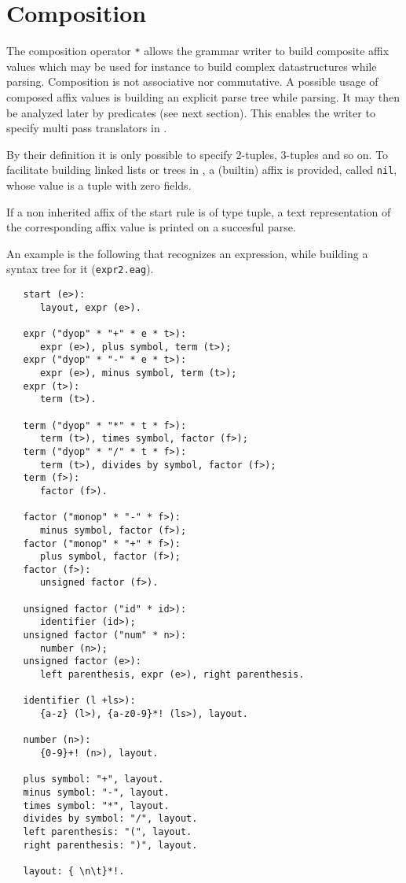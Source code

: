 \section {Composition}
The composition operator \verb+*+ allows the grammar writer
to build composite affix values which may be used for instance
to build complex datastructures while parsing. Composition is not
associative nor commutative. A possible usage of composed affix
values is building an explicit parse tree while parsing. It may
then be analyzed later by predicates (see next section). This
enables the \EAG writer to specify multi pass translators in \EAGns.

By their definition it is only possible to specify 2-tuples,
3-tuples and so on. To facilitate building linked lists or
trees in \EAGns, a (builtin) affix is provided, called {\tt nil},
whose value is a tuple with zero fields.

If a non inherited affix of the start rule is of type tuple, a
text representation of the corresponding affix value is printed
on a succesful parse.

An example is the following \EAG that recognizes an expression,
while building a syntax tree for it ({\tt expr2.eag}).
\begin{verbatim}
   start (e>):
      layout, expr (e>).

   expr ("dyop" * "+" * e * t>):
      expr (e>), plus symbol, term (t>);
   expr ("dyop" * "-" * e * t>):
      expr (e>), minus symbol, term (t>);
   expr (t>):
      term (t>).

   term ("dyop" * "*" * t * f>):
      term (t>), times symbol, factor (f>);
   term ("dyop" * "/" * t * f>):
      term (t>), divides by symbol, factor (f>);
   term (f>):
      factor (f>).

   factor ("monop" * "-" * f>):
      minus symbol, factor (f>);
   factor ("monop" * "+" * f>):
      plus symbol, factor (f>);
   factor (f>):
      unsigned factor (f>).

   unsigned factor ("id" * id>):
      identifier (id>);
   unsigned factor ("num" * n>):
      number (n>);
   unsigned factor (e>):
      left parenthesis, expr (e>), right parenthesis.

   identifier (l +ls>):
      {a-z} (l>), {a-z0-9}*! (ls>), layout.

   number (n>):
      {0-9}+! (n>), layout.

   plus symbol: "+", layout.
   minus symbol: "-", layout.
   times symbol: "*", layout.
   divides by symbol: "/", layout.
   left parenthesis: "(", layout.
   right parenthesis: ")", layout.

   layout: { \n\t}*!.
\end{verbatim}
